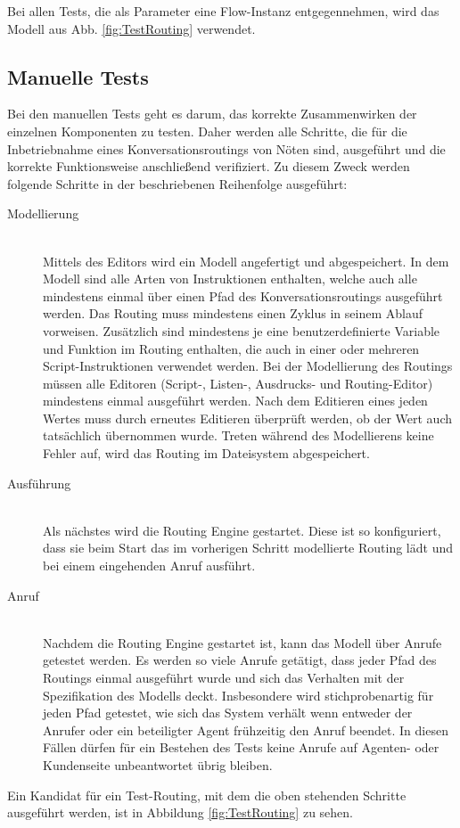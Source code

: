 \noindent Bei allen Tests, die als Parameter eine Flow-Instanz entgegennehmen, wird das Modell aus Abb. \ref{fig:TestRouting} verwendet. 

\subsection{Manuelle Tests}
Bei den manuellen Tests geht es darum, das korrekte Zusammenwirken der einzelnen Komponenten zu testen. Daher werden alle Schritte, die für die Inbetriebnahme eines Konversationsroutings von Nöten sind, ausgeführt und die korrekte Funktionsweise anschließend verifiziert. Zu diesem Zweck werden folgende Schritte in der beschriebenen Reihenfolge ausgeführt:
\begin{description}
\item[Modellierung] \hfill \\
Mittels des Editors wird ein Modell angefertigt und abgespeichert. In dem Modell sind alle Arten von Instruktionen enthalten, welche auch alle mindestens einmal über einen Pfad des Konversationsroutings ausgeführt werden. Das Routing muss mindestens einen Zyklus in seinem Ablauf vorweisen. Zusätzlich sind mindestens je eine benutzerdefinierte Variable und Funktion im Routing enthalten, die auch in einer oder mehreren Script-Instruktionen verwendet werden. Bei der Modellierung des Routings müssen alle Editoren (Script-, Listen-, Ausdrucks- und Routing-Editor) mindestens einmal ausgeführt werden. Nach dem Editieren eines jeden Wertes muss durch erneutes Editieren überprüft werden, ob der Wert auch tatsächlich übernommen wurde. Treten während des Modellierens keine Fehler auf, wird das Routing im Dateisystem abgespeichert. 
\item[Ausführung] \hfill \\
Als nächstes wird die Routing Engine gestartet. Diese ist so konfiguriert, dass sie beim Start das im vorherigen Schritt modellierte Routing lädt und bei einem eingehenden Anruf ausführt.
\item[Anruf] \hfill \\
Nachdem die Routing Engine gestartet ist, kann das Modell über Anrufe getestet werden. Es werden so viele Anrufe getätigt, dass jeder Pfad des Routings einmal ausgeführt wurde und sich das Verhalten mit der Spezifikation des Modells deckt. Insbesondere wird stichprobenartig für jeden Pfad getestet, wie sich das System verhält wenn entweder der Anrufer oder ein beteiligter Agent frühzeitig den Anruf beendet. In diesen Fällen dürfen für ein Bestehen des Tests keine Anrufe auf Agenten- oder Kundenseite unbeantwortet übrig bleiben.
\end{description}
Ein Kandidat für ein Test-Routing, mit dem die oben stehenden Schritte ausgeführt werden, ist in Abbildung \ref{fig:TestRouting} zu sehen.

